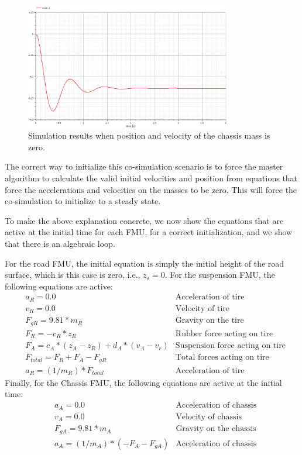 \begin{figure}[htb]
    \centering
    \includegraphics[width=0.8\textwidth]{images/init_state_0_sim.png}
    \caption{Simulation results when position and velocity of the chassis mass is zero. }
    \label{fig:init_state_0_sim}
\end{figure}

The correct way to initialize this co-simulation scenario is to force the master algorithm to calculate the valid initial velocities and position from equations that force the accelerations and velocities on the masses to be zero.
This will force the co-simulation to initialize to a steady state.

To make the above explanation concrete, we now show the equations that are active at the initial time for each FMU, for a correct initialization, and we show that there is an algebraic loop.

For the road FMU, the initial equation is simply the initial height of the road surface, which is this case is zero, i.e., $z_s=0$.
For the suspension FMU, the following equations are active:
\begin{align}
& a_R = 0.0 & \text{Acceleration of tire} \\
& v_R = 0.0 & \text{Velocity of tire} \\
& F_{gR} = 9.81 * m_R  & \text{Gravity on the tire} \\
& F_R = - c_R * z_R  & \text{Rubber force acting on tire} \\
& F_A = c_A * (z_A - z_R) + d_A * (v_A - v_r)  & \text{Suspension force acting on tire} \\
& F_{\mathit{total}} = F_R + F_A - F_{gR} & \text{Total forces acting on tire} \\
& a_R = (1/m_R) * F_{\mathit{total}}  & \text{Acceleration of tire}
\end{align}
Finally, for the Chassis FMU, the following equations are active at the initial time:
\begin{align}
& a_A = 0.0 & \text{Acceleration of chassis} \\
& v_A = 0.0 & \text{Velocity of chassis} \\
& F_{gA} = 9.81 * m_A  & \text{Gravity on the chassis} \\
& a_A = (1/m_A) * (- F_A - F_{gA})  & \text{Acceleration of chassis}
\end{align}

